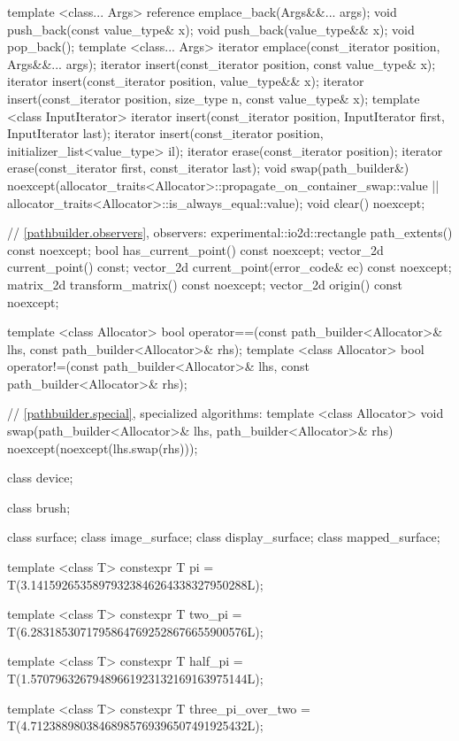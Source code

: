 \begin{codeblock}
{{{{{    template <class... Args>
    reference emplace_back(Args&&... args);
    void push_back(const value_type& x);
    void push_back(value_type&& x);
    void pop_back();
    template <class... Args>
    iterator emplace(const_iterator position, Args&&... args);
    iterator insert(const_iterator position, const value_type& x);
    iterator insert(const_iterator position, value_type&& x);
    iterator insert(const_iterator position, size_type n, const value_type& x);
    template <class InputIterator>
    iterator insert(const_iterator position, InputIterator first,
      InputIterator last);
    iterator insert(const_iterator position,
      initializer_list<value_type> il);
    iterator erase(const_iterator position);
    iterator erase(const_iterator first, const_iterator last);
    void swap(path_builder&)
      noexcept(allocator_traits<Allocator>::propagate_on_container_swap::value 
        || allocator_traits<Allocator>::is_always_equal::value);
    void clear() noexcept;

    // \ref{pathbuilder.observers}, observers:
    experimental::io2d::rectangle path_extents() const noexcept;
    bool has_current_point() const noexcept;
    vector_2d current_point() const;
    vector_2d current_point(error_code& ec) const noexcept;
    matrix_2d transform_matrix() const noexcept;
    vector_2d origin() const noexcept;
  }

  template <class Allocator>
  bool operator==(const path_builder<Allocator>& lhs, 
    const path_builder<Allocator>& rhs);
  template <class Allocator>
  bool operator!=(const path_builder<Allocator>& lhs, 
    const path_builder<Allocator>& rhs);
  
  // \ref{pathbuilder.special}, specialized algorithms:
  template <class Allocator>
  void swap(path_builder<Allocator>& lhs, path_builder<Allocator>& rhs)
    noexcept(noexcept(lhs.swap(rhs)));
  
  class device;

  class brush;
  
  class surface;
  class image_surface;
  class display_surface;
  class mapped_surface;
  
  template <class T>
  constexpr T pi = T(3.14159265358979323846264338327950288L);
  
  template <class T>
  constexpr T two_pi = T(6.28318530717958647692528676655900576L);
  
  template <class T>
  constexpr T half_pi = T(1.57079632679489661923132169163975144L);
  
  template <class T>
  constexpr T three_pi_over_two = T(4.71238898038468985769396507491925432L);
  
}}}}
\end{codeblock}
